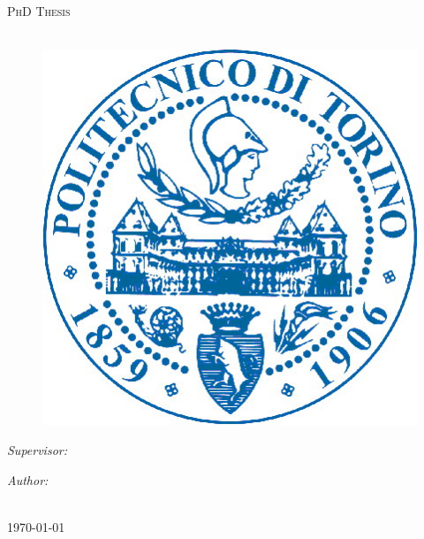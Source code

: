 \documentclass[11pt, a4paper, oneside]{Thesis} %
\begin{document}
\begin{titlepage}
\begin{center}

\textsc{\LARGE \univname}\\[1.5cm] %

\large \DEPTNAME\\[1.3cm] %

\textsc{\Large PhD Thesis}\\[0.7cm] %

{\huge \bfseries \ttitle}\\[4cm] %

\begin{figure}[H]
	\centering
		\includegraphics[scale=0.3]{./Figures/Polito.jpg}
\end{figure} 


\begin{minipage}{0.4\textwidth}
\begin{flushleft} \large
\emph{Supervisor:}\\
{\supname} %
\end{flushleft}
\end{minipage} 
\begin{minipage}{0.4\textwidth}
\begin{flushright} \large
\emph{Author:} \\
{\authornames} %
\end{flushright}
\end{minipage}\\[3cm]

 
{\large \today} %
 
\vfill
\end{center}

\end{titlepage}
\end{document}
